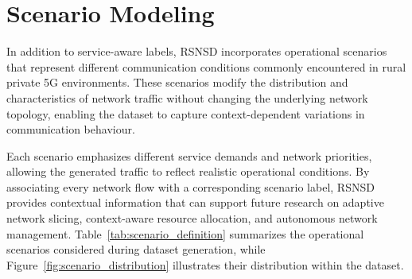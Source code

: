 \documentclass[12pt,a4paper]{report}
\begin{document}
	
	\section{Scenario Modeling}
	\label{sec:scenario_modeling}
	
	In addition to service-aware labels, RSNSD incorporates operational scenarios that represent different communication conditions commonly encountered in rural private 5G environments. These scenarios modify the distribution and characteristics of network traffic without changing the underlying network topology, enabling the dataset to capture context-dependent variations in communication behaviour.
	
	Each scenario emphasizes different service demands and network priorities, allowing the generated traffic to reflect realistic operational conditions. By associating every network flow with a corresponding scenario label, RSNSD provides contextual information that can support future research on adaptive network slicing, context-aware resource allocation, and autonomous network management. Table~\ref{tab:scenario_definition} summarizes the operational scenarios considered during dataset generation, while Figure~\ref{fig:scenario_distribution} illustrates their distribution within the dataset.
	
\end{document}
